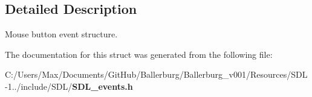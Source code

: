 \subsection{Detailed Description}
Mouse button event structure. 

The documentation for this struct was generated from the following file\+:\begin{DoxyCompactItemize}
\item 
C\+:/\+Users/\+Max/\+Documents/\+Git\+Hub/\+Ballerburg/\+Ballerburg\+\_\+v001/\+Resources/\+S\+D\+L-\/1../include/\+S\+D\+L/{\bf S\+D\+L\+\_\+events.\+h}\end{DoxyCompactItemize}
